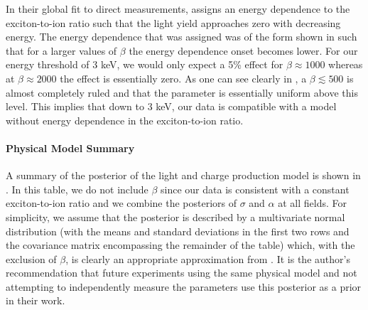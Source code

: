 In their global fit to direct measurements,  assigns an energy dependence to the exciton-to-ion ratio such that the light yield approaches zero with decreasing energy.  The energy dependence that was assigned was of the form shown in  such that for a larger values of $\beta$ the energy dependence onset becomes lower.  For our energy threshold of 3 keV, we would only expect a 5\% effect for $\beta \approx 1000$ whereas at $\beta \approx 2000$ the effect is essentially zero.  As one can see clearly in , a $\beta \lesssim 500$ is almost completely ruled and that the parameter is essentially uniform above this level.  This implies that down to 3 keV, our data is compatible with a model without energy dependence in the exciton-to-ion ratio.  


\paragraph{Physical Model Summary}

A summary of the posterior of the light and charge production model is shown in .  In this table, we do not include $\beta$ since our data is consistent with a constant exciton-to-ion ratio and we combine the posteriors of $\sigma$ and $\alpha$ at all fields.  For simplicity, we assume that the posterior is described by a multivariate normal distribution (with the means and standard deviations in the first two rows and the covariance matrix encompassing the remainder of the table) which, with the exclusion of $\beta$, is clearly an appropriate approximation from . It is the author's recommendation that future experiments using the same physical model and not attempting to independently measure the parameters use this posterior as a prior in their work.

